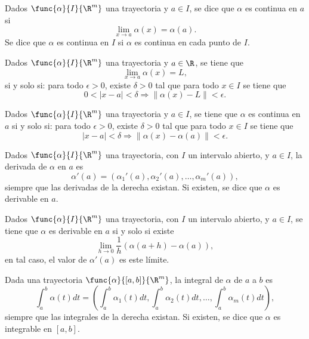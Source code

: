 \documentclass[a4,11pt]{aleph-notas}
\begin{document}
\begin{defi}[Continuidad]
    Dados $\func{\alpha}{I}{\R^m}$ una trayectoria y $a\in I$, se dice que $\alpha$ es continua en $a$ si
    \[
        \lim_{x\to a}\alpha(x)=\alpha(a).
    \]
    Se dice que $\alpha$ es continua en $I$ si $\alpha$ es continua en cada punto de $I$.
\end{defi}

\begin{prop}
    Dados $\func{\alpha}{I}{\R^m}$ una trayectoria y $a\in \R$, se tiene que
    \[
        \lim_{x\to a}\alpha(x)=L,
    \]
    si y solo si: para todo $\epsilon>0$, existe $\delta>0$ tal que para todo $x\in I$ se tiene que
    \[
        0<|x-a|<\delta \Longrightarrow \|\alpha(x)-L\|<\epsilon.
    \]
\end{prop}

\begin{prop}
    Dados $\func{\alpha}{I}{\R^m}$ una trayectoria y $a\in I$, se tiene que $\alpha$ es continua en $a$ si y solo si: para todo $\epsilon>0$, existe $\delta>0$ tal que para todo $x\in I$ se tiene que
    \[
        |x-a|<\delta \Longrightarrow \|\alpha(x)-\alpha(a)\|<\epsilon.
    \]
\end{prop}

\begin{defi}[Derivada]
    Dados $\func{\alpha}{I}{\R^m}$ una trayectoria, con $I$ un intervalo abierto, y $a\in I$, la derivada de $\alpha$ en $a$ es
    \[
        \alpha'(a)=\left(\alpha_1'(a),\alpha_2'(a),\ldots,\alpha_m'(a)\right),
    \]
    siempre que las derivadas de la derecha existan. Si existen, se dice que $\alpha$ es derivable en $a$.
\end{defi}

\begin{prop}
    Dados $\func{\alpha}{I}{\R^m}$ una trayectoria, con $I$ un intervalo abierto, y $a\in I$, se tiene que $\alpha$ es derivable en $a$ si y solo si existe
    \[
        \lim_{h\to 0} \frac 1 h ( \alpha(a+h)-\alpha(a) ),
    \]
    en tal caso, el valor de $\alpha'(a)$ es este límite.
\end{prop}

\begin{defi}[Integral]
    Dada una trayectoria $\func{\alpha}{[a,b]}{\R^m}$, la integral de $\alpha$ de $a$ a $b$ es
    \[
        \int_a^b \alpha(t)dt=\left(\int_a^b \alpha_1(t)dt,\int_a^b \alpha_2(t)dt,\ldots,\int_a^b \alpha_m(t)dt\right),
    \]
    siempre que las integrales de la derecha existan. Si existen, se dice que $\alpha$ es integrable en $[a,b]$.
\end{defi}
\end{document}
